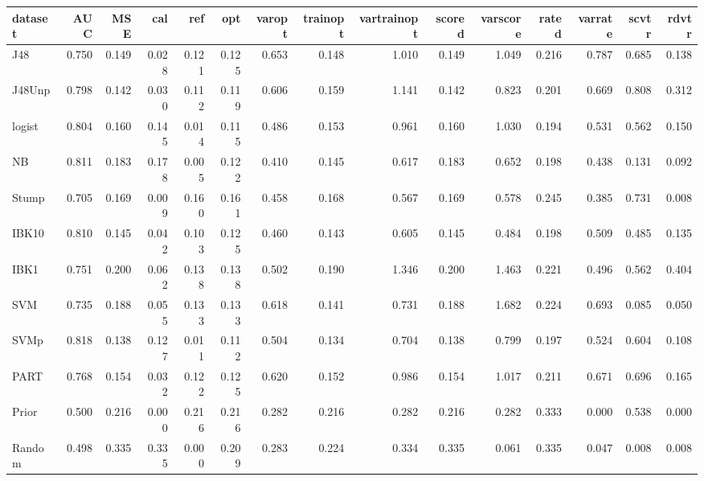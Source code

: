 \begin{table}[ht]
\centering
\begingroup\footnotesize
\begin{tabular}{lrrrrrrrrrrrrrr}
  \hline
dataset & AUC & MSE & cal & ref & opt & varopt & trainopt & vartrainopt & scored & varscore & rated & varrate & scvtr & rdvtr \\ 
  \hline
J48 & 0.750 & 0.149 & 0.028 & 0.121 & 0.125 & 0.653 & 0.148 & 1.010 & 0.149 & 1.049 & 0.216 & 0.787 & 0.685 & 0.138 \\ 
  J48Unp & 0.798 & 0.142 & 0.030 & 0.112 & 0.119 & 0.606 & 0.159 & 1.141 & 0.142 & 0.823 & 0.201 & 0.669 & 0.808 & 0.312 \\ 
  logist & 0.804 & 0.160 & 0.145 & 0.014 & 0.115 & 0.486 & 0.153 & 0.961 & 0.160 & 1.030 & 0.194 & 0.531 & 0.562 & 0.150 \\ 
  NB & 0.811 & 0.183 & 0.178 & 0.005 & 0.122 & 0.410 & 0.145 & 0.617 & 0.183 & 0.652 & 0.198 & 0.438 & 0.131 & 0.092 \\ 
  Stump & 0.705 & 0.169 & 0.009 & 0.160 & 0.161 & 0.458 & 0.168 & 0.567 & 0.169 & 0.578 & 0.245 & 0.385 & 0.731 & 0.008 \\ 
  IBK10 & 0.810 & 0.145 & 0.042 & 0.103 & 0.125 & 0.460 & 0.143 & 0.605 & 0.145 & 0.484 & 0.198 & 0.509 & 0.485 & 0.135 \\ 
  IBK1 & 0.751 & 0.200 & 0.062 & 0.138 & 0.138 & 0.502 & 0.190 & 1.346 & 0.200 & 1.463 & 0.221 & 0.496 & 0.562 & 0.404 \\ 
  SVM & 0.735 & 0.188 & 0.055 & 0.133 & 0.133 & 0.618 & 0.141 & 0.731 & 0.188 & 1.682 & 0.224 & 0.693 & 0.085 & 0.050 \\ 
  SVMp & 0.818 & 0.138 & 0.127 & 0.011 & 0.112 & 0.504 & 0.134 & 0.704 & 0.138 & 0.799 & 0.197 & 0.524 & 0.604 & 0.108 \\ 
  PART & 0.768 & 0.154 & 0.032 & 0.122 & 0.125 & 0.620 & 0.152 & 0.986 & 0.154 & 1.017 & 0.211 & 0.671 & 0.696 & 0.165 \\ 
  Prior & 0.500 & 0.216 & 0.000 & 0.216 & 0.216 & 0.282 & 0.216 & 0.282 & 0.216 & 0.282 & 0.333 & 0.000 & 0.538 & 0.000 \\ 
  Random & 0.498 & 0.335 & 0.335 & 0.000 & 0.209 & 0.283 & 0.224 & 0.334 & 0.335 & 0.061 & 0.335 & 0.047 & 0.008 & 0.008 \\ 
   \hline
\end{tabular}
\endgroup
\end{table}
